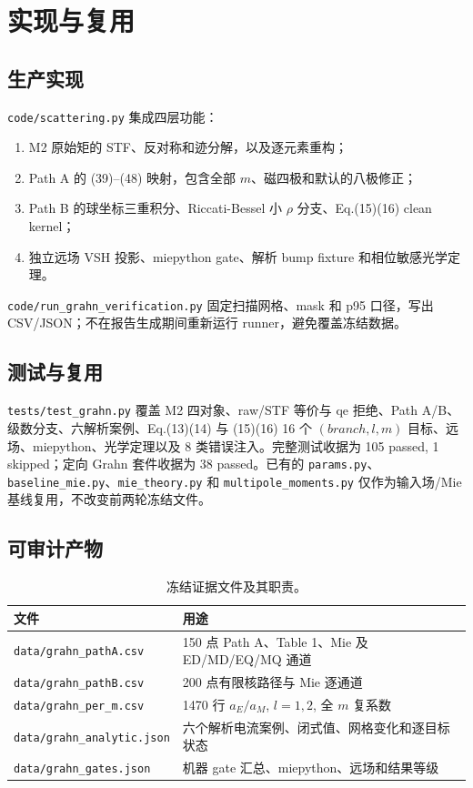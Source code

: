 \section{实现与复用}

\subsection{生产实现}

\texttt{code/scattering.py} 集成四层功能：
\begin{enumerate}
 \item M2 原始矩的 STF、反对称和迹分解，以及逐元素重构；
 \item Path A 的 (39)--(48) 映射，包含全部 $m$、磁四极和默认的八极修正；
 \item Path B 的球坐标三重积分、Riccati-Bessel 小 $\rho$ 分支、Eq.(15)(16) clean kernel；
 \item 独立远场 VSH 投影、miepython gate、解析 bump fixture 和相位敏感光学定理。
\end{enumerate}
\texttt{code/run\_grahn\_verification.py} 固定扫描网格、mask 和 p95 口径，写出 CSV/JSON；不在报告生成期间重新运行 runner，避免覆盖冻结数据。

\subsection{测试与复用}

\texttt{tests/test\_grahn.py} 覆盖 M2 四对象、raw/STF 等价与 qe 拒绝、Path A/B、级数分支、六解析案例、Eq.(13)(14) 与 (15)(16) 16 个 $(branch,l,m)$ 目标、远场、miepython、光学定理以及 8 类错误注入。完整测试收据为 105 passed, 1 skipped；定向 Grahn 套件收据为 38 passed。已有的 \texttt{params.py}、\texttt{baseline\_mie.py}、\texttt{mie\_theory.py} 和 \texttt{multipole\_moments.py} 仅作为输入场/Mie 基线复用，不改变前两轮冻结文件。

\subsection{可审计产物}

\begin{table}[H]
\centering\small
\begin{tabularx}{\textwidth}{lX}
\toprule
文件 & 用途 \\
\midrule
\texttt{data/grahn\_pathA.csv} & 150 点 Path A、Table 1、Mie 及 ED/MD/EQ/MQ 通道 \\
\texttt{data/grahn\_pathB.csv} & 200 点有限核路径与 Mie 逐通道 \\
\texttt{data/grahn\_per\_m.csv} & 1470 行 $a_E/a_M$, $l=1,2$, 全 $m$ 复系数 \\
\texttt{data/grahn\_analytic.json} & 六个解析电流案例、闭式值、网格变化和逐目标状态 \\
\texttt{data/grahn\_gates.json} & 机器 gate 汇总、miepython、远场和结果等级 \\
\bottomrule
\end{tabularx}
\caption{冻结证据文件及其职责。}
\end{table}
